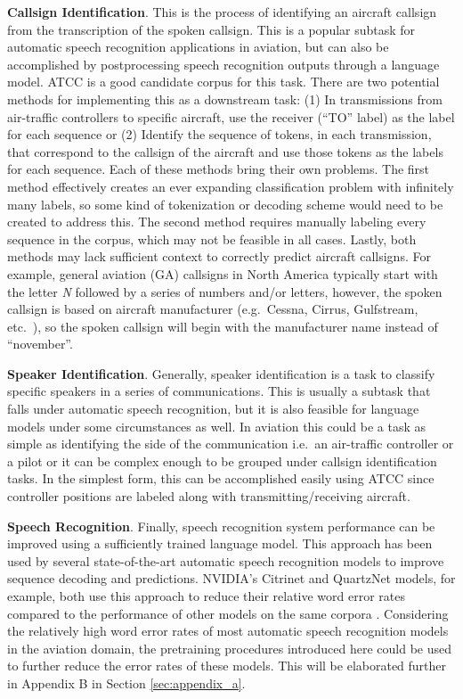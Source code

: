 \documentclass[12pt]{article}
\begin{document}
\textbf{Callsign Identification}. This is the process of identifying an aircraft callsign from the transcription of the spoken callsign. This is a
popular subtask for automatic speech recognition applications in aviation, but can also be accomplished by postprocessing speech recognition outputs
through a language model. ATCC is a good candidate corpus for this task. There are two potential methods for implementing this as a downstream task:
(1) In transmissions from air-traffic controllers to specific aircraft, use the receiver (``TO'' label) as the label for each sequence or (2) Identify
the sequence of tokens, in each transmission, that correspond to the callsign of the aircraft and use those tokens as the labels for each sequence.
Each of these methods bring their own problems. The first method effectively creates an ever expanding classification problem with infinitely many
labels, so some kind of tokenization or decoding scheme would need to be created to address this. The second method requires manually labeling every
sequence in the corpus, which may not be feasible in all cases. Lastly, both methods may lack sufficient context to correctly predict aircraft
callsigns. For example, general aviation (GA) callsigns in North America typically start with the letter \textit{N} followed by a series of numbers
and/or letters, however, the spoken callsign is based on aircraft manufacturer (e.g.~Cessna, Cirrus, Gulfstream, etc.~), so the spoken callsign will
begin with the manufacturer name instead of ``november''.

\textbf{Speaker Identification}. Generally, speaker identification is a task to classify specific speakers in a series of communications. This is
usually a subtask that falls under automatic speech recognition, but it is also feasible for language models under some circumstances as well. In
aviation this could be a task as simple as identifying the side of the communication i.e.~an air-traffic controller or a pilot or it can be complex
enough to be grouped under callsign identification tasks. In the simplest form, this can be accomplished easily using ATCC since controller positions
are labeled along with transmitting/receiving aircraft.

\textbf{Speech Recognition}. Finally, speech recognition system performance can be improved using a sufficiently trained language model. This approach
has been used by several state-of-the-art automatic speech recognition models to improve sequence decoding and predictions. NVIDIA's Citrinet and
QuartzNet models, for example, both use this approach to reduce their relative word error rates compared to the performance of other models on the
same corpora \cite{majumdar_citrinet_2021,kriman_quartznet_2020}. Considering the relatively high word error rates of most automatic speech
recognition models in the aviation domain, the pretraining procedures introduced here could be used to further reduce the error rates of these models.
This will be elaborated further in Appendix B in Section \ref{sec:appendix_a}.
\end{document}
